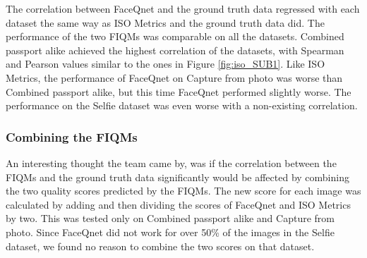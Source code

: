 \noindent
The correlation between FaceQnet and the ground truth data regressed with each dataset the same way as ISO Metrics and the ground truth data did. The performance of the two FIQMs was comparable on all the datasets. Combined passport alike achieved the highest correlation of the datasets, with Spearman and Pearson values similar to the ones in Figure \ref{fig:iso_SUB1}. Like ISO Metrics, the performance of FaceQnet on Capture from photo was worse than Combined passport alike, but this time FaceQnet performed slightly worse. The performance on the Selfie dataset was even worse with a non-existing correlation. 

\subsubsection{Combining the FIQMs}
An interesting thought the team came by, was if the correlation between the FIQMs and the ground truth data significantly would be affected by combining the two quality scores predicted by the FIQMs. The new score for each image was calculated by adding and then dividing the scores of FaceQnet and ISO Metrics by two. This was tested only on Combined passport alike and Capture from photo. Since FaceQnet did not work for over 50\% of the images in the Selfie dataset, we found no reason to combine the two scores on that dataset. 

